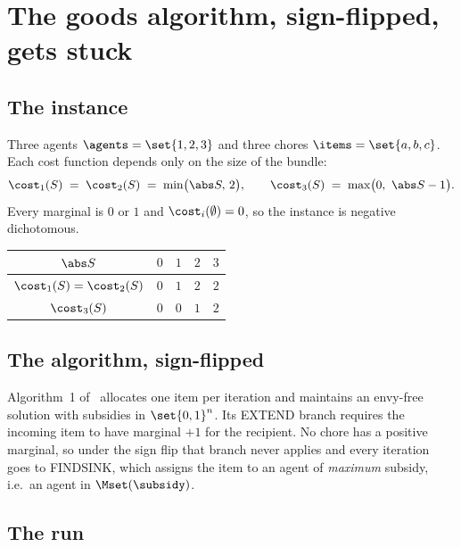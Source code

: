 
\section{The goods algorithm, sign-flipped, gets stuck}
\label{sec:whynotbkns}

\subsection{The instance}

Three agents $\agents = \set{1,2,3}$ and three chores $\items = \set{a,b,c}$.
Each cost function depends only on the size of the bundle:
\[
  \cost_1(S) \;=\; \cost_2(S) \;=\; \min\bigl(\abs S,\,2\bigr),
  \qquad
  \cost_3(S) \;=\; \max\bigl(0,\ \abs S - 1\bigr).
\]
Every marginal is $0$ or $1$ and $\cost_i(\emptyset) = 0$, so the instance is
negative dichotomous.

\begin{center}
\begin{tabular}{c|cccc}
$\abs S$ & $0$ & $1$ & $2$ & $3$ \\
\hline
$\cost_1(S) = \cost_2(S)$ & $0$ & $1$ & $2$ & $2$ \\
$\cost_3(S)$ & $0$ & $0$ & $1$ & $2$ \\
\end{tabular}
\end{center}

\subsection{The algorithm, sign-flipped}

Algorithm~1 of~\cite{BKNS22} allocates one item per iteration and maintains an
envy-free solution with subsidies in $\set{0,1}^n$. Its EXTEND branch requires
the incoming item to have marginal $+1$ for the recipient. No chore has a
positive marginal, so under the sign flip that branch never applies and every
iteration goes to FINDSINK, which assigns the item to an agent of
\emph{maximum} subsidy, i.e.\ an agent in $\Mset(\subsidy)$.

\subsection{The run}

